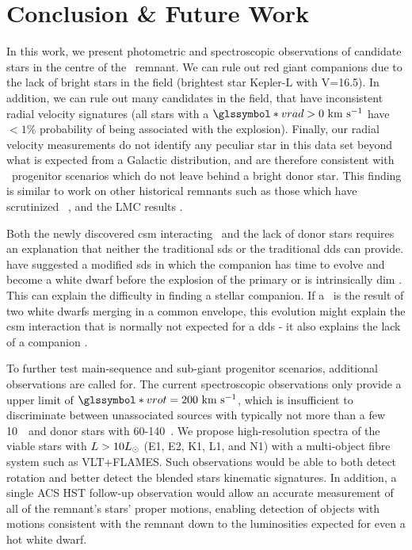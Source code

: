 \documentclass[preprint2]{aastex}
\begin{document}



\section{Conclusion \& Future Work}

\label{sec:conclusion}

In this work, we present photometric and spectroscopic observations of candidate stars in the centre of the \ remnant. We can rule out red giant companions due to the lack of bright stars in the field (brightest star Kepler-L with V=16.5). In addition, we can rule out many candidates in the field, that have inconsistent radial velocity signatures (all stars with a $\vrad>0~\kms$ have $< 1\%$ probability of being associated with the explosion). Finally, our radial velocity measurements do not identify any peculiar star in this data set beyond what is expected from a Galactic distribution, and are therefore consistent with \snia\ progenitor scenarios which do not leave behind a bright donor star. This finding is similar to work on other historical remnants such as those which have scrutinized \ \citep{2012Natur.489..533G,2012ApJ...759....7K}, and the LMC results \citep{2012ApJ...747L..19E, 2012Natur.481..164S}. 

Both the newly discovered \gls{csm} interacting \sneia\ and the lack of donor stars requires an explanation that neither the traditional \gls{sds} or the traditional \gls{dds} can provide. \citet{2011ApJ...730L..34J,2011ApJ...738L...1D,2012ApJ...744...69H,2012ApJ...756L...4H} have suggested a modified \gls{sds} in which the companion has time to evolve and become a white dwarf before the explosion of the primary or is intrinsically dim \citep{2012ApJ...758..123W}. This can explain the difficulty in finding a stellar companion. If a \snia\ is the result of two white dwarfs merging in a common envelope, this evolution might explain the \gls{csm} interaction that is normally not expected for a \gls{dds} - it also explains the lack of a companion \citep[][van Kerkwijk priv. comm. ]{2011MNRAS.417.1466K}.  

To further test main-sequence and sub-giant progenitor scenarios, additional observations are called for. The current spectroscopic observations only provide a upper limit of $\vrot=200~\kms$, which is insufficient to discriminate between unassociated sources with typically not more than a few 10~\kms\ and donor stars with 60-140~\kms \citep[see Figure~4 in ][]{2012ApJ...759....7K}. We propose high-resolution spectra of the viable stars with $L>10\hbox{$L_{\odot}$}$ (E1, E2, K1, L1, and N1) with a multi-object fibre system such as VLT+FLAMES. Such observations would be able to both detect rotation and better detect the blended stars kinematic signatures. In addition, a single ACS HST follow-up observation would allow an accurate measurement of all of the remnant's stars' proper motions, enabling detection of objects with motions consistent with the remnant down to the luminosities expected for even a hot white dwarf. 
\end{document}
